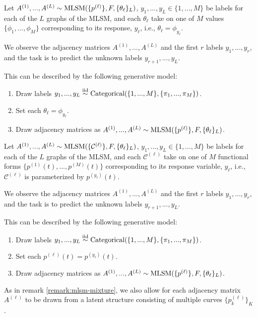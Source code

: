 \documentclass[12pt]{article}
\begin{document}
\begin{definition}
\label{def:mlsm-c-1}
Let $A^{(1)}, ..., A^{(L)} \sim \mathrm{MLSM}(\{p^{(\ell)}\}, F, \{\theta_\ell\}_L)$, $y_1, ..., y_L \in \{1, ..., M\}$ be labels for each of the $L$ graphs of the MLSM, and each $\theta_\ell$ take on one of $M$ values $\{\phi_1, ..., \phi_M\}$ corresponding to its response, $y_\ell$, i.e., $\theta_\ell = \phi_{y_\ell}$. 

We observe the adjacency matrices $A^{(1)}, ..., A^{(L)}$ and the first $r$ labels $y_1, ..., y_r$, and the task is to predict the unknown labels $y_{r+1}, ..., y_L$. 

This can be described by the following generative model:

\begin{enumerate}
  \item Draw labels $y_1, ..., y_L \stackrel{\mathrm{iid}}{\sim} \mathrm{Categorical}(\{1, ..., M\}, \{\pi_1, ..., \pi_M\})$.
  \item Set each $\theta_\ell = \phi_{y_\ell}$.
  \item Draw adjacency matrices as $A^{(1)}, ..., A^{(L)} \sim \mathrm{MLSM}(\{p^{(\ell)}\}, F, \{\theta_\ell\}_L)$.
\end{enumerate}
\end{definition}

\begin{definition}
\label{def:mlsm-c-2}
Let $A^{(1)}, ..., A^{(L)} \sim \mathrm{MLSM}(\{\mathcal{C}^{(\ell)}\}, F, \{\theta_\ell\}_L)$, $y_1, ..., y_L \in \{1, ..., M\}$ be labels for each of the $L$ graphs of the MLSM, and each $\mathcal{C}^{(\ell)}$ take on one of $M$ functional forms $\{p^{(1)}(t), ..., p^{(M)}(t)\}$ corresponding to its response variable, $y_\ell$, i.e., $\mathcal{C}^{(\ell)}$ is parameterized by $p^{(y_\ell)}(t)$. 

We observe the adjacency matrices $A^{(1)}, ..., A^{(L)}$ and the first $r$ labels $y_1, ..., y_r$, and the task is to predict the unknown labels $y_{r+1}, ..., y_L$. 

This can be described by the following generative model:

\begin{enumerate}
  \item Draw labels $y_1, ..., y_L \stackrel{\mathrm{iid}}{\sim} \mathrm{Categorical}(\{1, ..., M\}, \{\pi_1, ..., \pi_M\})$.
  \item Set each $p^{(\ell)}(t) = p^{(y_\ell)}(t)$.
  \item Draw adjacency matrices as $A^{(1)}, ..., A^{(L)} \sim \mathrm{MLSM}(\{p^{(\ell)}\}, F, \{\theta_\ell\}_L)$.
\end{enumerate}

As in remark \ref{remark:mlsm-mixture}, we also allow for each adjacency matrix $A^{(\ell)}$ to be drawn from a latent structure consisting of multiple curves $\{p^{(\ell)}_k\}_K$. 
\end{definition}
\end{document}
